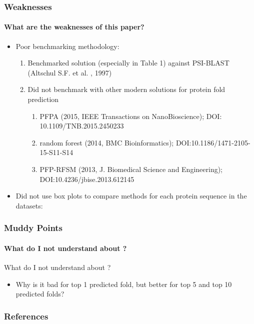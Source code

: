 \documentclass[xcolor={usenames,dvipsnames},hyperref={hyperindex,bookmarks}]{beamer}
\begin{document}
\frame
{
	\frametitle{Weaknesses}
	\framesubtitle{What are the weaknesses of this paper?}

	\begin{itemize}
	\item Poor benchmarking methodology: 
		\begin{enumerate} 
		\item Benchmarked solution (especially in Table 1) against PSI-BLAST (Altschul S.F. et al. , 1997)
		\item Did not benchmark with other modern solutions for protein fold prediction
			\begin{enumerate} 
			\item PFPA (2015, IEEE Transactions on NanoBioscience); DOI: 10.1109/TNB.2015.2450233
			\item random forest (2014, BMC Bioinformatics); DOI:10.1186/1471-2105-15-S11-S14
			\item PFP-RFSM (2013, J. Biomedical Science and Engineering); DOI:10.4236/jbise.2013.612145 
			\end{enumerate}
		\end{enumerate}
	\item Did not use box plots to compare methods for each protein sequence in the datasets:
	\end{itemize}

}







\frame
{
	\frametitle{Muddy Points}
	\framesubtitle{What do I not understand about \cite{Hou2018}?}

	What do I not understand about \cite{Hou2018}?
	\begin{itemize}
	\item Why is it bad for top 1 predicted fold, but better for top 5 and top 10 predicted folds?
	\end{itemize}

}















\frame
{
	\frametitle{References}



	{\linespread{1}
	
	
	}
}
\end{document}

